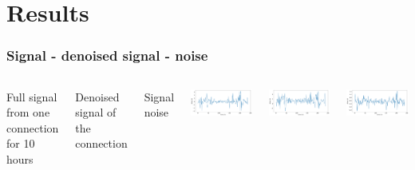 \documentclass{beamer}
\begin{document}
\section{Results}
\begin{frame}
\frametitle{Signal - denoised signal - noise}
\begin{columns}
Full signal from one connection for 10 hours

\vspace{1.8cm}

Denoised signal of the connection

\vspace{1.8cm}

Signal noise

\includegraphics[height=0.28\textheight]{noisy-time-delay-data-10-days.png}

\includegraphics[height=0.28\textheight]{denoised-time-delay-data-ten-days.png}

\includegraphics[height=0.28\textheight]{the-noise-ten-days.png}

\end{columns}

\end{frame}
\end{document}
